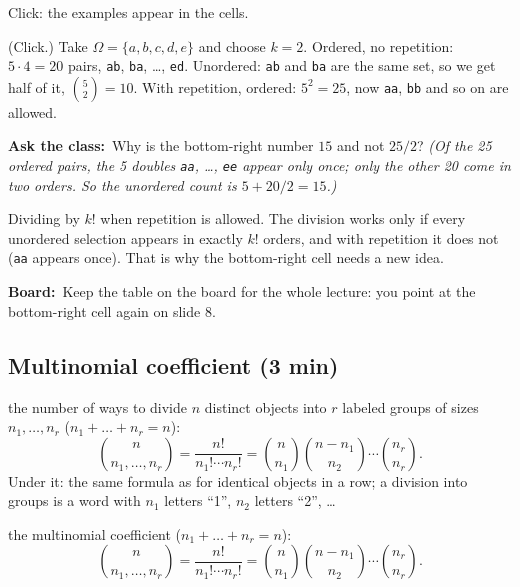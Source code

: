 \documentclass[11pt,a4paper,parskip=half]{scrartcl}
\newcommand{\Om}{\Omega}
\newcommand{\board}{\textbf{\color{gold}Board:}\ }
\newcommand{\ask}{\textbf{\color{navy}Ask the class:}\ }
\begin{document}
\begin{slidecue}
	Click: the examples appear in the cells.
\end{slidecue}

(Click.) Take $\Om=\{a,b,c,d,e\}$ and choose $k=2$. Ordered, no repetition:
$5\cdot4=20$ pairs, \texttt{ab}, \texttt{ba}, \dots, \texttt{ed}. Unordered:
\texttt{ab} and \texttt{ba} are the same set, so we get half of it,
$\binom52=10$. With repetition, ordered: $5^2=25$, now \texttt{aa},
\texttt{bb} and so on are allowed.

\ask Why is the bottom-right number $15$ and not $25/2$? \emph{(Of the 25
ordered pairs, the 5 doubles \texttt{aa}, \dots, \texttt{ee} appear only
once; only the other 20 come in two orders. So the unordered count is
$5+20/2=15$.)}

\begin{mistake}
	Dividing by $k!$ when repetition is allowed. The division works only if
	every unordered selection appears in exactly $k!$ orders, and with
	repetition it does not (\texttt{aa} appears once). That is why the
	bottom-right cell needs a new idea.
\end{mistake}

\board Keep the table on the board for the whole lecture: you point at the
bottom-right cell again on slide 8.

\subsection{Multinomial coefficient (3 min)}

\begin{onslide}
	the number of ways to divide $n$ distinct objects into $r$ labeled
	groups of sizes $n_1,\dots,n_r$ ($n_1+\dots+n_r=n$):
	\[ \binom{n}{n_1,\dots,n_r}=\frac{n!}{n_1!\cdots n_r!}
		=\binom{n}{n_1}\binom{n-n_1}{n_2}\cdots\binom{n_r}{n_r}. \]
	Under it: the same formula as for identical objects in a row; a division
	into groups is a word with $n_1$ letters ``1'', $n_2$ letters ``2'',
	\dots
\end{onslide}

\begin{printeq}
\begin{slidefig}
	the multinomial coefficient ($n_1+\dots+n_r=n$):
	\[ \binom{n}{n_1,\dots,n_r}=\frac{n!}{n_1!\cdots n_r!}
		=\binom{n}{n_1}\binom{n-n_1}{n_2}\cdots\binom{n_r}{n_r}. \]
\end{slidefig}
\end{printeq}
\end{document}
